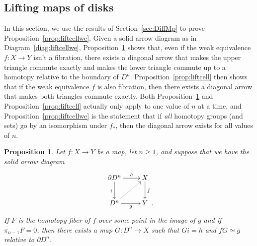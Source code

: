 \documentclass[12pt]{amsart}
\numberwithin{equation}{section}
\theoremstyle{slplain}
\newtheorem{prop}[equation]{Proposition}
\theoremstyle{definition}
\theoremstyle{remark}
\newcommand{\propref}{Proposition~\ref}
\newcommand{\diagref}{Diagram~\ref}
\newcommand{\secref}{Section~\ref}
\newcommand{\bdry}{\partial}
\newcommand{\homotopic}{\simeq}
\newcommand{\Period}{\rlap{\enspace .}}
\begin{document}
\subsection{Lifting maps of disks}
\label{sec:LiftDisks}

In this section, we use the results of \secref{sec:DiffMp} to prove
\propref{prop:liftcellwe}.  Given a solid arrow diagram as in
\diagref{diag:liftcellwe}, \propref{prop:lift} shows that, even if the
weak equivalence $f\colon X \to Y$ isn't a fibration, there exists a
diagonal arrow that makes the upper triangle commute exactly and makes
the lower triangle commute up to a homotopy relative to the boundary
of $D^{n}$.  \propref{prop:liftcell} then shows that if the weak
equivalence $f$ is also fibration, then there exists a diagonal arrow
that makes both triangles commute exactly.  Both \propref{prop:lift}
and \propref{prop:liftcell} actually only apply to one value of $n$ at
a time, and \propref{prop:liftcellwe} is the statement that if
\emph{all} homotopy groups (and sets) go by an isomorphism under
$f_{*}$, then the diagonal arrow exists for all values of $n$.

\begin{prop}
  \label{prop:lift}
  Let $f\colon X \to Y$ be a map, let $n \ge 1$, and suppose that we
  have the solid arrow diagram
  \begin{displaymath}
    \xymatrix{
      {\bdry D^{n}} \ar[r]^-{h} \ar[d]_{i}
      & {X} \ar[d]^{f}\\
      {D^{n}} \ar[r]_-{g} \ar@{..>}[ur]
      & {Y \Period}
    }
  \end{displaymath}
  If $F$ is the homotopy fiber of $f$ over some point in the image of
  $g$ and if $\pi_{n-1}F = 0$, then there exists a map $G\colon D^{n}
  \to X$ such that $Gi = h$ and $fG \homotopic g$ relative to
  $\bdry D^{n}$.
\end{prop}
\end{document}
